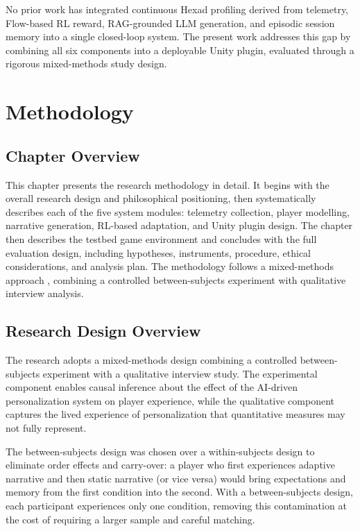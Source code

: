 \documentclass[12pt,a4paper]{report}
\begin{document}
No prior work has integrated continuous Hexad profiling derived from telemetry, Flow-based RL reward, RAG-grounded LLM generation, and episodic session memory into a single closed-loop system. The present work addresses this gap by combining all six components into a deployable Unity plugin, evaluated through a rigorous mixed-methods study design.


\chapter{Methodology}

\section{Chapter Overview}

This chapter presents the research methodology in detail. It begins with the overall research design and philosophical positioning, then systematically describes each of the five system modules: telemetry collection, player modelling, narrative generation, RL-based adaptation, and Unity plugin design. The chapter then describes the testbed game environment and concludes with the full evaluation design, including hypotheses, instruments, procedure, ethical considerations, and analysis plan. The methodology follows a mixed-methods approach \citep{creswell2017mixed}, combining a controlled between-subjects experiment with qualitative interview analysis.

\section{Research Design Overview}

The research adopts a mixed-methods design combining a controlled between-subjects experiment with a qualitative interview study. The experimental component enables causal inference about the effect of the AI-driven personalization system on player experience, while the qualitative component captures the lived experience of personalization that quantitative measures may not fully represent.

The between-subjects design was chosen over a within-subjects design to eliminate order effects and carry-over: a player who first experiences adaptive narrative and then static narrative (or vice versa) would bring expectations and memory from the first condition into the second. With a between-subjects design, each participant experiences only one condition, removing this contamination at the cost of requiring a larger sample and careful matching.
\end{document}
